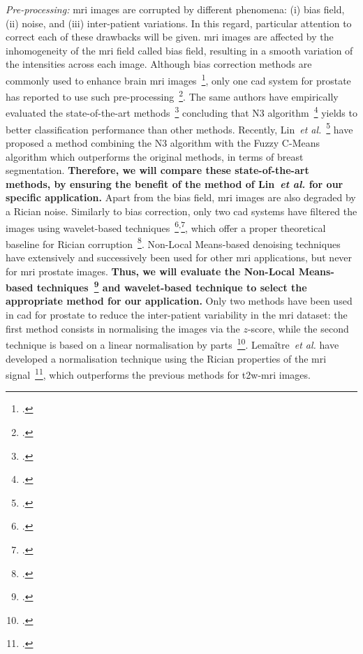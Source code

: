 \emph{Pre-processing:}
\Ac{mri} images are corrupted by different phenomena: (i) bias field, (ii) noise, and (iii) inter-patient variations.
In this regard, particular attention to correct each of these drawbacks will be given.
\Ac{mri} images are affected by the inhomogeneity of the \ac{mri} field called bias field, resulting in a smooth variation of the intensities across each image.
Although bias correction methods are commonly used to enhance brain \ac{mri} images~\footcite{Vovk2007}, only one \ac{cad} system for prostate has reported to use such pre-processing~\footcite{Viswanath2009}.
The same authors have empirically evaluated the state-of-the-art methods~\footcite{viswanath2011empirical} concluding that N3 algorithm~\footcite{Sled1998} yields to better classification performance than other methods.
Recently, Lin~\emph{et al.}~\footcite{Lin2011} have proposed a method combining the N3 algorithm with the Fuzzy C-Means algorithm which outperforms the original methods, in terms of breast segmentation.
\textbf{Therefore, we will compare these state-of-the-art methods, by ensuring the benefit of the method of Lin~\emph{et al.} for our specific application.}
Apart from the bias field, \Ac{mri} images are also degraded by a Rician noise. 
Similarly to bias correction, only two \ac{cad} systems have filtered the images using wavelet-based techniques~\footcite{Mallat2008}\textsuperscript{,}\footcite{Pizurica2003}, which offer a proper theoretical baseline for Rician corruption~\footcite{Nowak1999}.
Non-Local Means-based denoising techniques have extensively and successively been used for other \ac{mri} applications, but never for \ac{mri} prostate images.
\textbf{Thus, we will evaluate the Non-Local Means-based techniques~\footcite{Manjon2012} and wavelet-based technique to select the appropriate method for our application.}
Only two methods have been used in \ac{cad} for prostate to reduce the inter-patient variability in the \ac{mri} dataset: the first method consists in normalising the images via the $z$-score, while the second technique is based on a linear normalisation by parts~\footcite{Madabhushi2006a}.
Lema\^itre~\emph{et al.} have developed a normalisation technique using the Rician properties of the \ac{mri} signal~\footcite{lemaitre2016normalization}, which outperforms the previous methods for \ac{t2w}-\ac{mri} images.
